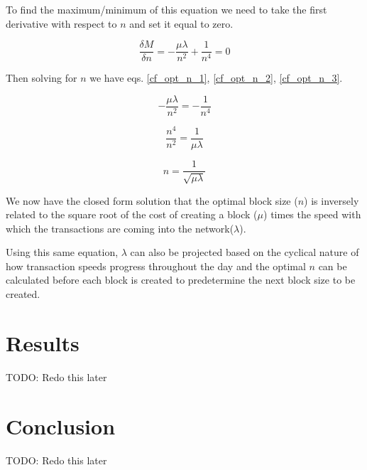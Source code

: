 \documentclass[conference]{IEEEtran}
\begin{document}
To find the maximum/minimum of this equation we need to take the first derivative with respect to $n$ 
and set it equal to zero. 

\begin{equation}
\frac{\delta M}{\delta n}=-\frac{\mu\lambda}{n^2}+\frac{1}{n^4}=0\label{metric_deriv}
\end{equation}

Then solving for $n$ we have eqs. \ref{cf_opt_n_1}, \ref{cf_opt_n_2}, \ref{cf_opt_n_3}.

\begin{equation}
-\frac{\mu\lambda}{n^2}=-\frac{1}{n^4}\label{cf_opt_n_1}
\end{equation}

\begin{equation}
\frac{n^4}{n^2}=\frac{1}{\mu\lambda}\label{cf_opt_n_2}
\end{equation}

\begin{equation}
n=\frac{1}{\sqrt{\mu\lambda}}\label{cf_opt_n_3}
\end{equation}

We now have the closed form solution that the optimal block size ($n$) is inversely related to
the square root of the cost of creating a block ($\mu$) times the speed with which the transactions 
are coming into the network($\lambda$). 

Using this same equation, $\lambda$ can also be projected based on the cyclical nature of how transaction
speeds progress throughout the day and the optimal $n$ can be calculated before each block is created to 
predetermine the next block size to be created. 
\fi

\section{Results}

TODO: Redo this later

\section{Conclusion}

TODO: Redo this later



\end{document}
